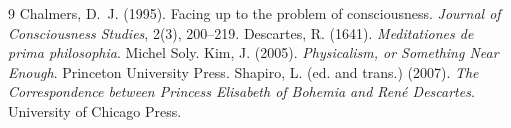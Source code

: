 \documentclass{situationist-preprint}
\begin{document}
\begin{thebibliography}{9}\small
{} Chalmers, D.~J. (1995). Facing up to the problem of consciousness. \emph{Journal of Consciousness Studies}, 2(3), 200--219.
 Descartes, R. (1641). \emph{Meditationes de prima philosophia}. Michel Soly.
 Kim, J. (2005). \emph{Physicalism, or Something Near Enough}. Princeton University Press.
 Shapiro, L. (ed. and trans.) (2007). \emph{The Correspondence between Princess Elisabeth of Bohemia and Ren\'e Descartes}. University of Chicago Press.
\end{thebibliography}
\end{document}
